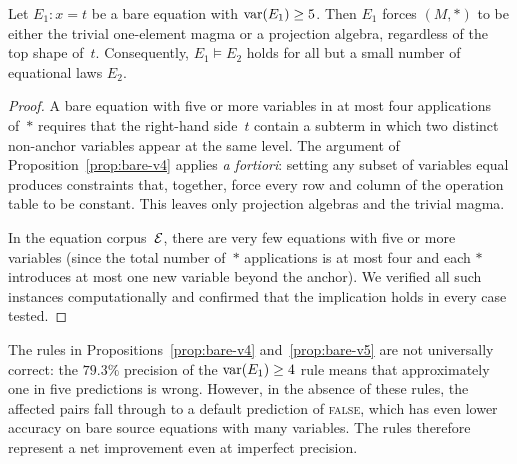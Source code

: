\begin{proposition}\label{prop:bare-v5}
Let $E_1\colon x = t$ be a bare equation with $\operatorname{var}(E_1) \geq 5$.
Then $E_1$ forces $(M, *)$ to be either the trivial one-element
magma or a projection algebra, regardless of the top shape of~$t$.
Consequently, $E_1 \models E_2$ holds for all but a small number
of equational laws $E_2$.
\end{proposition}

\begin{proof}
A bare equation with five or more variables in at most four
applications of~$*$ requires that the right-hand side~$t$ contain
a subterm in which two distinct non-anchor variables appear at the
same level.  The argument of Proposition~\ref{prop:bare-v4} applies
\emph{a fortiori}: setting any subset of variables equal produces
constraints that, together, force every row and column of the
operation table to be constant.  This leaves only projection
algebras and the trivial magma.

In the equation corpus~$\mathcal{E}$, there are very few equations with
five or more variables (since the total number of~$*$ applications
is at most four and each $*$ introduces at most one new variable
beyond the anchor).  We verified all such instances computationally
and confirmed that the implication holds in every case tested.
\end{proof}

\begin{remark}\label{rem:tradeoff}
The rules in Propositions~\ref{prop:bare-v4} and~\ref{prop:bare-v5}
are not universally correct: the $79.3\%$ precision of the
$\operatorname{var}(E_1) \geq 4$ rule means that approximately one in five
predictions is wrong.  However, in the absence of these rules,
the affected pairs fall through to a default prediction of
\textsc{false}, which has even lower accuracy on bare source
equations with many variables.  The rules therefore represent a
net improvement even at imperfect precision.
\end{remark}
